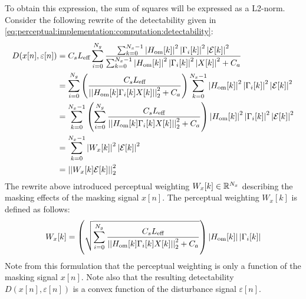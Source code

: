To obtain this expression, the sum of squares will be expressed as a L2-norm.
Consider the following rewrite of the detectability given in \autoref{eq:perceptual:implementation:computation:detectability}: 
\begin{align*}
    D(x[n],\varepsilon[n]) &= C_s L_\text{eff}\sum_{i=0}^{N_g}
                        \frac{\sum_{k=0}^{N_x-1}\left|H_\text{om}[k]\right|^2\left|
                            \Gamma_i[k]\right|^2\left|\mathcal{E}[k]\right|^2}
                        {\sum_{k=0}^{N_x-1}\left|H_\text{om}[k]\right|^2\left|
                            \Gamma_i[k]\right|^2\left|X[k]\right|^2 + C_a} \\
                           &= \sum_{i=0}^{N_g}
                           \left(\frac{C_s L_\text{eff}}{\norm[2][2]{H_\text{om}[k]\Gamma_i[k]X[k]} + C_a}\right)
                        \sum_{k=0}^{N_x-1}\left|H_\text{om}[k]\right|^2\left|
                        \Gamma_i[k]\right|^2\left|\mathcal{E}[k]\right|^2 \\
                           &= \sum_{k=0}^{N_x-1}\left(\sum_{i=0}^{N_g}\frac{C_s L_\text{eff}}{\norm[2][2]{H_\text{om}[k]\Gamma_i[k]X[k]} + C_a}\right)
                        \left|H_\text{om}[k]\right|^2\left|\Gamma_i[k]\right|^2\left|\mathcal{E}[k]\right|^2 \\
                           &= \sum_{k=0}^{N_x-1}\left|W_x[k]\right|^2\left|\mathcal{E}[k]\right|^2 \\
                           &= \norm[2][2]{W_x[k]\mathcal{E}[k]} 
\end{align*}
The rewrite above introduced perceptual weighting $W_x[k]\in\mathbb{R}^{N_x}$ describing the masking effects of the masking signal $x[n]$. 
The perceptual weighting $W_x[k]$ is defined as follows: 
\begin{equation}
    W_x[k] = \left(\sqrt{\sum_{i=0}^{N_g}\frac{C_s L_\text{eff}}{\norm[2][2]{H_\text{om}[k]\Gamma_i[k]X[k]} + C_a}}\right)
                        \left|H_\text{om}[k]\right|\left|\Gamma_i[k]\right|
\end{equation}
Note from this formulation that the perceptual weighting is only a function of the masking signal $x[n]$.
Note also that the resulting detectability $D(x[n],\varepsilon[n])$ is a convex function of the disturbance signal $\varepsilon[n]$. 

